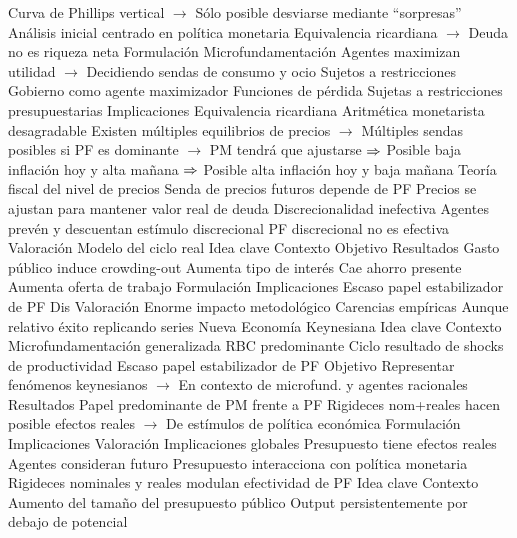 \documentclass{nuevotema}
\begin{document}
\begin{esquemal}
				\4[] Curva de Phillips vertical
				\4[] $\to$ Sólo posible desviarse mediante ``sorpresas''
				\4[] Análisis inicial centrado en política monetaria
				\4[] Equivalencia ricardiana
				\4[] $\to$ Deuda no es riqueza neta
			\3 Formulación
				\4 Microfundamentación
				\4[] Agentes maximizan utilidad
				\4[] $\to$ Decidiendo sendas de consumo y ocio
				\4[] Sujetos a restricciones
				\4 Gobierno como agente maximizador
				\4[] Funciones de pérdida
				\4[] Sujetas a restricciones presupuestarias
			\3 Implicaciones
				\4 Equivalencia ricardiana
				\4 Aritmética monetarista desagradable
				\4[] Existen múltiples equilibrios de precios
				\4[] $\to$ Múltiples sendas posibles
				\4[] si PF es dominante
				\4[] $\to$ PM tendrá que ajustarse
				\4[] $\Rightarrow$ Posible baja inflación hoy y alta mañana
				\4[] $\Rightarrow$ Posible alta inflación hoy y baja mañana
				\4 Teoría fiscal del nivel de precios
				\4[] Senda de precios futuros depende de PF
				\4[] Precios se ajustan para mantener valor real de deuda
				\4 Discrecionalidad inefectiva
				\4[] Agentes prevén y descuentan estímulo discrecional
				\4[] PF discrecional no es efectiva
			\3 Valoración
		\2 Modelo del ciclo real
			\3 Idea clave
				\4 Contexto
				\4 Objetivo
				\4 Resultados
				\4[] Gasto público induce crowding-out
				\4[] Aumenta tipo de interés
				\4[] Cae ahorro presente
				\4[] Aumenta oferta de trabajo
			\3 Formulación
			\3 Implicaciones
				\4 Escaso papel estabilizador de PF
				\4 Dis
			\3 Valoración
				\4 Enorme impacto metodológico
				\4 Carencias empíricas
				\4[] Aunque relativo éxito replicando series
		\2 Nueva Economía Keynesiana
			\3 Idea clave
				\4 Contexto
				\4[] Microfundamentación generalizada
				\4[] RBC predominante
				\4[] Ciclo resultado de shocks de productividad
				\4[] Escaso papel estabilizador de PF
				\4 Objetivo
				\4[] Representar fenómenos keynesianos
				\4[] $\to$ En contexto de microfund. y agentes racionales
				\4 Resultados
				\4[] Papel predominante de PM frente a PF
				\4[] Rigideces nom+reales hacen posible efectos reales
				\4[] $\to$ De estímulos de política económica
			\3 Formulación
			\3 Implicaciones
			\3 Valoración
		\2 Implicaciones globales
			\3 Presupuesto tiene efectos reales
			\3 Agentes consideran futuro
			\3 Presupuesto interacciona con política monetaria
			\3 Rigideces nominales y reales modulan efectividad de PF
	\1 
		\2 Idea clave
			\3 Contexto
				\4 Aumento del tamaño del presupuesto público
				\4 Output persistentemente por debajo de potencial

\end{esquemal}
\end{document}
